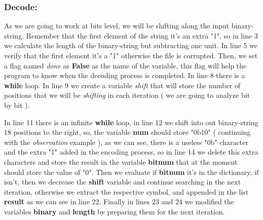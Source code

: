\subsubsection{Decode:}

As we are going to work at bits level, we will be shifting along the input binary-string. Remember that the first element of the string it's an extra "1", so in line 3 we calculate the length of the binary-string but subtracting one unit. In line 5 we verify that the first element it's a "1" otherwise the file is corrupted. Then, we set a flag named {\itshape done} as {\bfseries False} as the name of the variable, this flag will help the program to know when the decoding process is completed. In line 8 there is a {\bfseries while} loop. In line 9 we create a variable {\itshape shift} that will store the number of positions that we will be {\itshape shifting} in each iteration ( we are going to analyze bit by bit ). \hfill \break

{\bfseries\itshape\color{carmine}{Observation:}} {\itshape{}} \hfill \break

In line 11 there is an infinite {\bfseries while} loop, in line 12 we shift into out binary-string 18 positions to the right, so, the variable {\bfseries num} should store "0b10" ( continuing with the {\itshape observation} example ), as we can see, there is a useless "0b" character and the extra "1" added in the encoding process, so in line 14 we delete this extra characters and store the result in the variable {\bfseries bitnum} that at the moment should store the value of "0". Then we evaluate if {\bfseries bitnum} it's in the dictionary, if isn't, then we decrease the {\bfseries shift} variable and continue searching in the next iteration, otherwise we extract the respective symbol, and appended in the list {\bfseries result} as we can see in line 22. Finally in lines 23 and 24 we modified the variables {\bfseries binary} and {\bfseries length} by preparing them for the next iteration. \hfill \break

{\bfseries\itshape\color{carmine}{Observation:}} {\itshape{}} \hfill \break

